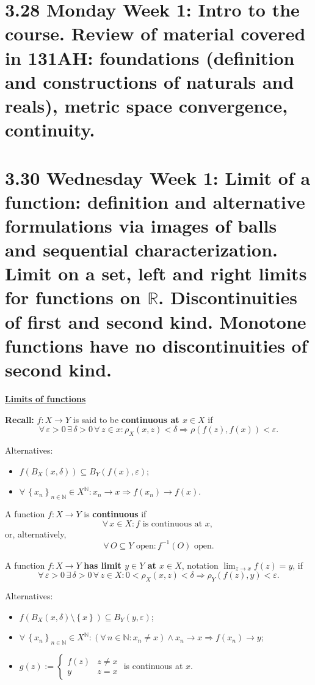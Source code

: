 \documentclass{notes}
\begin{document}
\section{3.28 Monday Week 1: Intro to the course. Review of material covered in 131AH: foundations (definition and constructions of naturals and reals), metric space convergence, continuity.}

\newpage

\section{3.30 Wednesday Week 1: Limit of a function: definition and alternative formulations via images of balls and sequential characterization. Limit on a set, left and right limits for functions on \texorpdfstring{$\mathbb R$}{R}. Discontinuities of first and second kind. Monotone functions have no discontinuities of second kind.}

\underline{{\boldmath \bfseries Limits of functions}}

{\boldmath \bfseries Recall:} $f \colon X \to Y$ is said to be {\boldmath \bfseries continuous at $x \in X$} if 
\[
  \forall \, \varepsilon > 0 \, \exists \, \delta > 0 \, \forall \, z \in x: \rho_X(x, z) < \delta \Rightarrow \rho(f(z), f(x)) < \varepsilon.
\]

Alternatives:
\begin{itemize}
  \item $f(B_X(x, \delta)) \subseteq B_Y(f(x), \varepsilon)$; 
  \item $\forall \, \left \{ x_n \right \}_{n \in \mathbb N} \in X^\mathbb N: x_n \to x \Rightarrow f(x_n) \to f(x)$.
\end{itemize}

A function $f \colon X \to Y$ is {\boldmath \bfseries continuous} if 
\[
  \forall \, x \in X: \text{$f$ is continuous at $x$, }
\]
or, alternatively,  
\[
  \forall \, O \subseteq Y \text{ open}: f^{-1}(O) \text{ open.}
\]

\begin{defn}
  A function $f \colon X \to Y$ {\boldmath \bfseries has limit $y \in Y$ at $x \in X$}, notation $\lim_{z \to x} f(z) = y$, if 
  \[
    \forall \, \varepsilon > 0 \, \exists \, \delta > 0 \, \forall \, z \in X: 0 < \rho_X(x, z) < \delta \Rightarrow \rho_Y(f(z), y) < \varepsilon.
  \]
  
  Alternatives: 
  \begin{itemize}
    \item $f(B_X(x, \delta) \setminus \left \{ x \right \}) \subseteq B_Y(y, \varepsilon)$; 

    \item $\forall \, \left \{ x_n \right \}_{n \in \mathbb N} \in X^\mathbb N: (\forall \, n \in \mathbb N: x_n \neq x) \land x_n \to x \Rightarrow f(x_n) \to y$; 
      
    \item $g(z) := \begin{cases}
      f(z) & z \neq x \\ 
      y & z = x
    \end{cases}$ is continuous at $x$.
  \end{itemize}
\end{defn}
\end{document}
